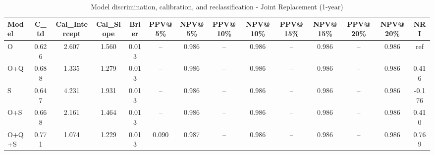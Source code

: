 \begin{table}[htbp]
\centering
\small
\caption{Model discrimination, calibration, and reclassification - Joint Replacement (1-year)}
\label{tab:perf_joint_1y}
\begin{tabular}{lccccccccccccc}
\toprule
Model & C\_td & Cal\_Intercept & Cal\_Slope & Brier & PPV@5\% & NPV@5\% & PPV@10\% & NPV@10\% & PPV@15\% & NPV@15\% & PPV@20\% & NPV@20\% & NRI \\
\midrule
O & 0.626 & 2.607 & 1.560 & 0.013 & -- & 0.986 & -- & 0.986 & -- & 0.986 & -- & 0.986 & ref \\
O+Q & 0.688 & 1.335 & 1.279 & 0.013 & -- & 0.986 & -- & 0.986 & -- & 0.986 & -- & 0.986 & 0.416 \\
S & 0.647 & 4.231 & 1.931 & 0.013 & -- & 0.986 & -- & 0.986 & -- & 0.986 & -- & 0.986 & -0.176 \\
O+S & 0.668 & 2.161 & 1.464 & 0.013 & -- & 0.986 & -- & 0.986 & -- & 0.986 & -- & 0.986 & 0.410 \\
O+Q+S & 0.771 & 1.074 & 1.229 & 0.013 & 0.090 & 0.987 & -- & 0.986 & -- & 0.986 & -- & 0.986 & 0.769 \\
\bottomrule
\end{tabular}
\end{table}
